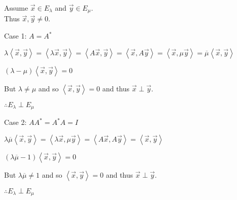 \documentclass[letterpaper,12pt,fleqn]{article}
\renewcommand{\l}{\lambda}
\newcommand{\m}{\mu}
\newcommand{\inner}[1]{\left<#1\right>}
\newcommand{\conj}[1]{\overline{#1}}
\newcommand{\vx}{\vec{x}}
\newcommand{\vy}{\vec{y}}
\begin{document}
\begin{theproof}
  Assume $\vx\in E_{\l}$ and $\vy\in E_{\m}$. \\
  Thus $\vx,\vy\ne0$.
  \begin{description}
  \item Case 1: $A=A^*$

    $\l\inner{\vx,\vy}=\inner{\l\vx,\vy}=\inner{A\vx,\vy}=\inner{\vx,A\vy}=
    \inner{\vx,\m\vy}=\conj{\m}\inner{\vx,\vy}$

    $(\l-\m)\inner{\vx,\vy}=0$

    But $\l\ne\m$ and so $\inner{\vx,\vy}=0$ and thus $\vx\perp\vy$.

    $\therefore E_{\l}\perp E_{\m}$

  \item Case 2: $AA^*=A^*A=I$

    $\l\conj{\m}\inner{\vx,\vy}=\inner{\l\vx,\m\vy}=\inner{A\vx,A\vy}=
    \inner{\vx,\vy}$

    $(\l\conj{\m}-1)\inner{\vx,\vy}=0$

    But $\l\conj{\m}\ne1$ and so $\inner{\vx,\vy}=0$ and thus $\vx\perp\vy$.

    $\therefore E_{\l}\perp E_{\m}$
  \end{description}
\end{theproof}
\end{document}
